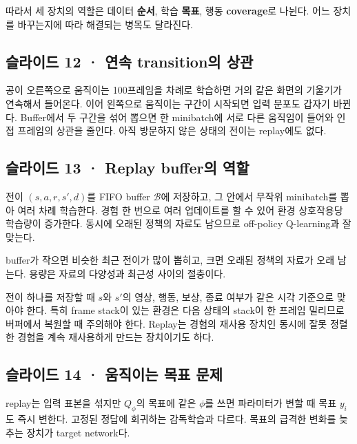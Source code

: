 \documentclass[11pt,a4paper]{article}
\begin{document}
따라서 세 장치의 역할은 데이터 \textbf{순서}, 학습 \textbf{목표}, 행동 \textbf{coverage}로 나뉜다. 어느 장치를 바꾸는지에 따라 해결되는 병목도 달라진다.\par

\subsection{슬라이드 12 · 연속 transition의 상관}

공이 오른쪽으로 움직이는 100프레임을 차례로 학습하면 거의 같은 화면의 기울기가 연속해서 들어온다. 이어 왼쪽으로 움직이는 구간이 시작되면 입력 분포도 갑자기 바뀐다. Buffer에서 두 구간을 섞어 뽑으면 한 minibatch에 서로 다른 움직임이 들어와 인접 프레임의 상관을 줄인다. 아직 방문하지 않은 상태의 전이는 replay에도 없다.\par

\subsection{슬라이드 13 · Replay buffer의 역할}

전이 $(s,a,r,s',d)$를 FIFO buffer $\mathcal B$에 저장하고, 그 안에서 무작위 minibatch를 뽑아 여러 차례 학습한다. 경험 한 번으로 여러 업데이트를 할 수 있어 환경 상호작용당 학습량이 증가한다. 동시에 오래된 정책의 자료도 남으므로 off-policy Q-learning과 잘 맞는다.\par

buffer가 작으면 비슷한 최근 전이가 많이 뽑히고, 크면 오래된 정책의 자료가 오래 남는다. 용량은 자료의 다양성과 최근성 사이의 절충이다.\par

전이 하나를 저장할 때 $s$와 $s'$의 영상, 행동, 보상, 종료 여부가 같은 시각 기준으로 맞아야 한다. 특히 frame stack이 있는 환경은 다음 상태의 stack이 한 프레임 밀리므로 버퍼에서 복원할 때 주의해야 한다. Replay는 경험의 재사용 장치인 동시에 잘못 정렬한 경험을 계속 재사용하게 만드는 장치이기도 하다.\par

\subsection{슬라이드 14 · 움직이는 목표 문제}

replay는 입력 표본을 섞지만 $Q_\phi$의 목표에 같은 $\phi$를 쓰면 파라미터가 변할 때 목표 $y_i$도 즉시 변한다. 고정된 정답에 회귀하는 감독학습과 다르다. 목표의 급격한 변화를 늦추는 장치가 target network다.\par
\end{document}

